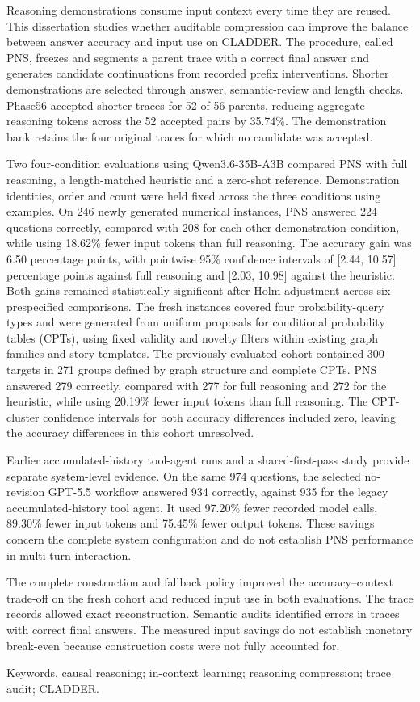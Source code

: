 Reasoning demonstrations consume input context every time they are reused. This dissertation studies whether auditable compression can improve the balance between answer accuracy and input use on CLADDER. The procedure, called PNS, freezes and segments a parent trace with a correct final answer and generates candidate continuations from recorded prefix interventions. Shorter demonstrations are selected through answer, semantic-review and length checks. Phase56 accepted shorter traces for 52 of 56 parents, reducing aggregate reasoning tokens across the 52 accepted pairs by 35.74\%. The demonstration bank retains the four original traces for which no candidate was accepted.

Two four-condition evaluations using Qwen3.6-35B-A3B compared PNS with full reasoning, a length-matched heuristic and a zero-shot reference. Demonstration identities, order and count were held fixed across the three conditions using examples. On 246 newly generated numerical instances, PNS answered 224 questions correctly, compared with 208 for each other demonstration condition, while using 18.62\% fewer input tokens than full reasoning. The accuracy gain was 6.50 percentage points, with pointwise 95\% confidence intervals of [2.44, 10.57] percentage points against full reasoning and [2.03, 10.98] against the heuristic. Both gains remained statistically significant after Holm adjustment across six prespecified comparisons. The fresh instances covered four probability-query types and were generated from uniform proposals for conditional probability tables (CPTs), using fixed validity and novelty filters within existing graph families and story templates. The previously evaluated cohort contained 300 targets in 271 groups defined by graph structure and complete CPTs. PNS answered 279 correctly, compared with 277 for full reasoning and 272 for the heuristic, while using 20.19\% fewer input tokens than full reasoning. The CPT-cluster confidence intervals for both accuracy differences included zero, leaving the accuracy differences in this cohort unresolved.

Earlier accumulated-history tool-agent runs and a shared-first-pass study provide separate system-level evidence. On the same 974 questions, the selected no-revision GPT-5.5 workflow answered 934 correctly, against 935 for the legacy accumulated-history tool agent. It used 97.20\% fewer recorded model calls, 89.30\% fewer input tokens and 75.45\% fewer output tokens. These savings concern the complete system configuration and do not establish PNS performance in multi-turn interaction.

The complete construction and fallback policy improved the accuracy--context trade-off on the fresh cohort and reduced input use in both evaluations. The trace records allowed exact reconstruction. Semantic audits identified errors in traces with correct final answers. The measured input savings do not establish monetary break-even because construction costs were not fully accounted for.

Keywords. causal reasoning; in-context learning; reasoning compression; trace audit; CLADDER.
